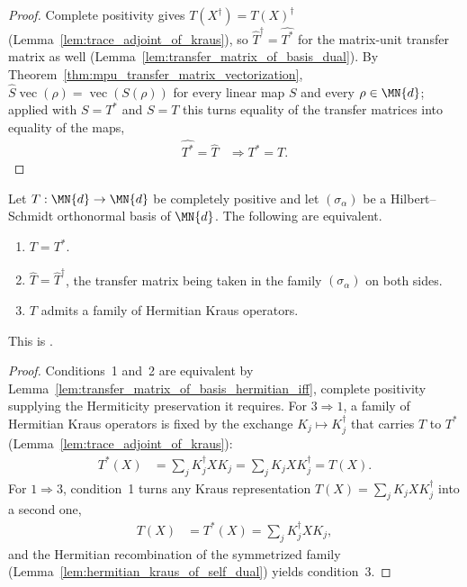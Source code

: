 \begin{proof}\leanok
    Complete positivity gives $T(X^\dagger)=T(X)^\dagger$
    (Lemma~\ref{lem:trace_adjoint_of_kraus}), so
    $\widehat T^\dagger=\widehat{T^*}$ for the matrix-unit transfer matrix as
    well (Lemma~\ref{lem:transfer_matrix_of_basis_dual}). By
    Theorem~\ref{thm:mpu_transfer_matrix_vectorization},
    $\widehat S\operatorname{vec}(\rho)=\operatorname{vec}(S(\rho))$ for every
    linear map $S$ and every $\rho\in\MN{d}$; applied with $S=T^*$ and $S=T$
    this turns equality of the transfer matrices into equality of the maps,
    \begin{align}
        \widehat{T^*}=\widehat T
        &\Rightarrow T^*=T.
    \end{align}
\end{proof}

\begin{theorem}
    \label{thm:self_dual_channels}
    \leanok
    Let $T:\MN{d}\to\MN{d}$ be completely positive and let $(\sigma_\alpha)$ be a
    Hilbert--Schmidt orthonormal basis of $\MN{d}$. The following are equivalent.
    \begin{enumerate}
        \item $T=T^*$.
        \item $\widehat T=\widehat T^\dagger$, the transfer matrix being taken in
            the family $(\sigma_\alpha)$ on both sides.
        \item $T$ admits a family of Hermitian Kraus operators.
    \end{enumerate}
    This is \cite[Proposition~2.6]{Wolf2012Quantum}.
\end{theorem}

\begin{proof}\leanok
    Conditions~1 and~2 are equivalent by
    Lemma~\ref{lem:transfer_matrix_of_basis_hermitian_iff}, complete positivity
    supplying the Hermiticity preservation it requires. For $3\Rightarrow1$, a
    family of Hermitian Kraus operators is fixed by the exchange
    $K_j\mapsto K_j^\dagger$ that carries $T$ to $T^*$
    (Lemma~\ref{lem:trace_adjoint_of_kraus}):
    \begin{align}
        T^*(X)
        &= \sum_j K_j^\dagger XK_j
         = \sum_j K_jXK_j^\dagger
         = T(X).
    \end{align}
    For $1\Rightarrow3$, condition~1 turns any Kraus representation
    $T(X)=\sum_jK_jXK_j^\dagger$ into a second one,
    \begin{align}
        T(X)
        &= T^*(X)
         = \sum_j K_j^\dagger XK_j,
    \end{align}
    and the Hermitian recombination of the symmetrized family
    (Lemma~\ref{lem:hermitian_kraus_of_self_dual}) yields condition~3.
\end{proof}
